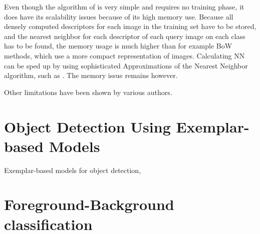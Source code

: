 \documentclass[a4paper,10pt]{article}
\begin{document}
Even though the algorithm of \cite{boiman2008defense} is very simple and requires no training phase, it does have its scalability issues because of its high memory use. Because all densely computed descriptors for each image in the training set have to be stored, and the nearest neighbor for each descriptor of each query image on each class has to be found, the memory usage is much higher than for example BoW methods, which use a more compact representation of images. Calculating NN can be sped up by using sophisticated Approximations of the Nearest Neighbor algorithm, such as . The memory issue remains however.

Other limitations have been shown by various authors. \cite{behmo2010towards, wang2011improved,mccann2011local,tuytelaars2011nbnn,timofte2012iterative}



\section{Object Detection Using Exemplar-based Models} %
\label{sec:object_detection}

Exemplar-based models for object detection, 


\section{Foreground-Background classification} %
\label{sec:foreground_background_classification}
\end{document}
